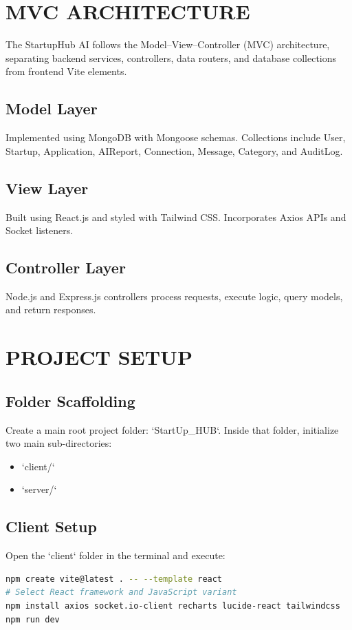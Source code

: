 \documentclass[12pt,a4paper]{report}
\begin{document}
\chapter{MVC ARCHITECTURE}
The StartupHub AI follows the Model–View–Controller (MVC) architecture, separating backend services, controllers, data routers, and database collections from frontend Vite elements.

\section{Model Layer}
Implemented using MongoDB with Mongoose schemas. Collections include User, Startup, Application, AIReport, Connection, Message, Category, and AuditLog.

\section{View Layer}
Built using React.js and styled with Tailwind CSS. Incorporates Axios APIs and Socket listeners.

\section{Controller Layer}
Node.js and Express.js controllers process requests, execute logic, query models, and return responses.

\chapter{PROJECT SETUP}
\section{Folder Scaffolding}
Create a main root project folder: `StartUp_HUB`. Inside that folder, initialize two main sub-directories:
\begin{itemize}
    \item `client/`
    \item `server/`
\end{itemize}

\section{Client Setup}
Open the `client` folder in the terminal and execute:
\begin{lstlisting}[language=bash]
npm create vite@latest . -- --template react
# Select React framework and JavaScript variant
npm install axios socket.io-client recharts lucide-react tailwindcss
npm run dev
\end{lstlisting}
\end{document}
